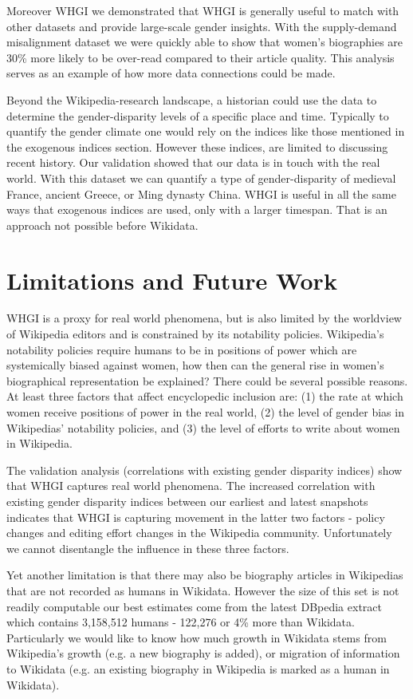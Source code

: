 \documentclass{sig-alternate-05-2015}
\begin{document}
Moreover WHGI we demonstrated that WHGI is generally useful to match with other datasets and provide large-scale gender insights. With the supply-demand misalignment dataset we were quickly able to show that women's biographies are 30\% more likely to be over-read compared to their article quality. This analysis serves as an example of how more data connections could be made. 

Beyond the Wikipedia-research landscape, a historian could use the data to determine the gender-disparity levels of a specific place and time. Typically to quantify the gender climate one would rely on the indices like those mentioned in the exogenous indices section. However these indices, are limited to discussing recent history. Our validation showed that our data is in touch with the real world. With this dataset we can quantify a type of gender-disparity of medieval France, ancient Greece, or Ming dynasty China. WHGI is useful in all the same ways that exogenous indices are used, only with a larger timespan. That is an approach not possible before Wikidata.

\section{Limitations and Future Work}
WHGI is a proxy for real world phenomena, but is also limited by the worldview of Wikipedia editors and is constrained by its notability policies. 
Wikipedia's notability policies require humans to be in positions of power which are systemically biased against women, how then can the general rise in women's biographical representation be explained? There could be several possible reasons. At least three factors that affect encyclopedic inclusion are: (1) the rate at which women receive positions of power in the real world, (2) the level of gender bias in Wikipedias' notability policies, and (3) the level of efforts to write about women in Wikipedia. 

The validation analysis (correlations with existing gender disparity indices) show that WHGI captures real world phenomena. The increased correlation with existing gender disparity indices between our earliest and latest snapshots indicates that WHGI is capturing movement in the latter two factors - policy changes and editing effort changes in the Wikipedia community. Unfortunately we cannot disentangle the influence in these three factors.

Yet another limitation is that there may also be biography articles in Wikipedias that are not recorded as humans in Wikidata. However the size of this set is not readily computable our best estimates come from the latest DBpedia extract which contains 3,158,512 humans - 122,276 or 4\% more than Wikidata. Particularly we would like to know how much growth in Wikidata stems from Wikipedia's growth (e.g. a new biography is added), or migration of information to Wikidata (e.g. an existing biography in Wikipedia is marked as a human in Wikidata).
\end{document}
